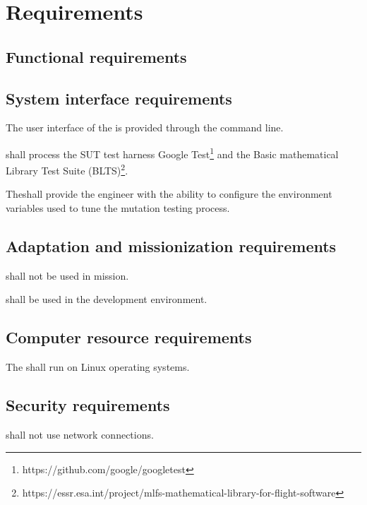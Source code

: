 \chapter{Requirements}

\section{Functional requirements}
\label{sec:requirements}






\section{System interface requirements}

\RQ{} The user interface of the \FAQAS is provided through the command line.

\RQ{} \FAQAS shall process the SUT test harness Google Test\footnote{https://github.com/google/googletest} and the Basic mathematical Library Test Suite (BLTS)\footnote{https://essr.esa.int/project/mlfs-mathematical-library-for-flight-software}.

\RQ{} The\FAQAS shall provide the engineer with the ability to configure the environment variables used to tune the mutation testing process.



\section{Adaptation and missionization requirements}

\RQ{} \FAQAS shall not be used in mission.

\RQ{} \FAQAS shall be used in the development environment. 




\section{Computer resource requirements}


\RQ{} The \FAQAS shall run on Linux operating systems.



\section{Security requirements }

\RQ{} \FAQAS shall not use network connections.

